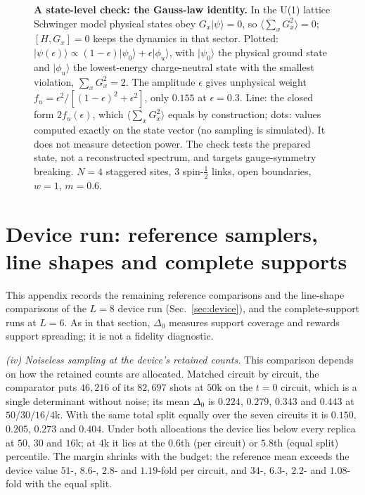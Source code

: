 \documentclass[submission, PhysCore]{SciPost}
\newcommand{\onecolfig}{\setlength{\columnwidth}{0.65\textwidth}}
\begin{document}
\begin{appendix}
\begin{figure}[tbp]
\centering\onecolfig

\caption{\textbf{A state-level check: the Gauss-law identity.} In the U(1) lattice Schwinger model physical states obey $G_x|\psi\rangle=0$, so $\langle\sum_x G_x^2\rangle=0$; $[H,G_x]=0$ keeps the dynamics in that sector. Plotted: $|\psi(\epsilon)\rangle\propto(1-\epsilon)|\psi_0\rangle+\epsilon|\phi_u\rangle$, with $|\psi_0\rangle$ the physical ground state and $|\phi_u\rangle$ the lowest-energy charge-neutral state with the smallest violation, $\sum_xG_x^2=2$. The amplitude $\epsilon$ gives unphysical weight $f_u=\epsilon^2/[(1-\epsilon)^2+\epsilon^2]$, only $0.155$ at $\epsilon=0.3$. Line: the closed form $2f_u(\epsilon)$, which $\langle\sum_xG_x^2\rangle$ equals by construction; dots: values computed exactly on the state vector (no sampling is simulated). It does not measure detection power. The check tests the prepared state, not a reconstructed spectrum, and targets gauge-symmetry breaking. $N=4$ staggered sites, $3$ spin-$\tfrac12$ links, open boundaries, $w=1$, $m=0.6$.}
\label{fig:gauss}
\end{figure}

\section{Device run: reference samplers, line shapes and complete supports}
\label{app:device}
This appendix records the remaining reference comparisons and the line-shape comparisons of the $L=8$ device run (Sec.~\ref{sec:device}), and the complete-support runs at $L=6$. As in that section, $\Delta_0$ measures support coverage and rewards support spreading; it is not a fidelity diagnostic.

\emph{(iv) Noiseless sampling at the device's retained counts.} This comparison depends on how the retained counts are allocated. Matched circuit by circuit, the comparator puts $46{,}216$ of its $82{,}697$ shots at $50$k on the $t=0$ circuit, which is a single determinant without noise; its mean $\Delta_0$ is $0.224$, $0.279$, $0.343$ and $0.443$ at $50$/$30$/$16$/$4$k. With the same total split equally over the seven circuits it is $0.150$, $0.205$, $0.273$ and $0.404$. Under both allocations the device lies below every replica at $50$, $30$ and $16$k; at $4$k it lies at the $0.6$th (per circuit) or $5.8$th (equal split) percentile. The margin shrinks with the budget: the reference mean exceeds the device value $51$-, $8.6$-, $2.8$- and $1.19$-fold per circuit, and $34$-, $6.3$-, $2.2$- and $1.08$-fold with the equal split.


\end{appendix}
\end{document}
